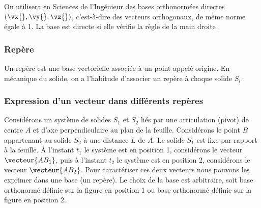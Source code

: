 \documentclass[11pt]{article}
\begin{document}
On utilisera en Sciences de l'Ingénieur des bases orthonormées directes $(\vx{}, \vy{}, \vz{})$,  c'est-à-dire des vecteurs orthogonaux, de même norme égale à 1. La base est directe si elle vérifie la \og règle de la main droite \fg{}.

\subsubsection{Repère}
Un repère est une base vectorielle associée à un point appelé origine. En mécanique du solide, on a l'habitude d'associer un repère  à chaque solide $S_i$.


\subsubsection{Expression d'un vecteur dans différents repères}
Considérons un système de solides $S_1$ et $S_2$ liés par une articulation (pivot) de centre $A$ et d'axe perpendiculaire au plan de la feuille. Considérons le point $B$ appartenant au solide $S_2$ à une distance $L$ de $A$. Le solide $S_1$ est fixe par rapport à la feuille. À l'instant $t_1$ le système est en position 1, considérons le vecteur $\vecteur{AB_1}$, puis à l'instant $t_2$ le système est en position 2, considérons le vecteur $\vecteur{AB_2}$. Pour caractériser ces deux vecteurs nous pouvons les exprimer dans une base (un repère). Le choix de la base est arbitraire, soit  base orthonormé définie sur la figure en position 1 ou  base orthonormé définie sur la figure en position 2. 
\end{document}

